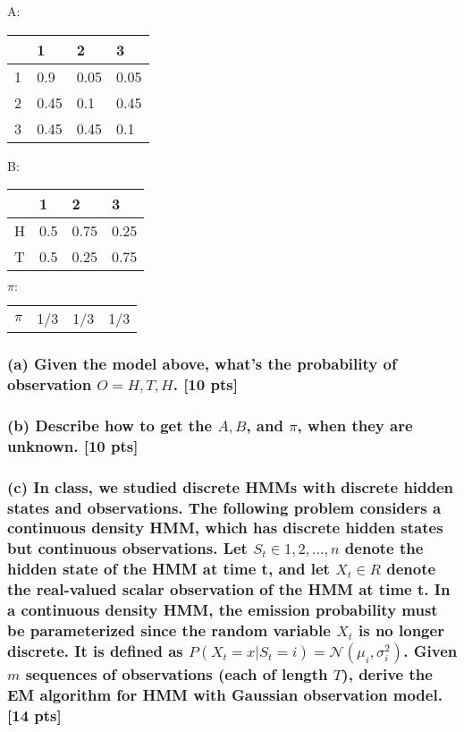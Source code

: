 \documentclass[twoside,11pt]{article}\usepackage{amsmath,amsfonts,amsthm,fullpage}
\begin{document}
\begin{table}[!htb]
    \begin{minipage}{.5\linewidth}
      \centering
A:
    \begin{tabular}{l|l|l|l}
    ~ & 1    & 2    & 3    \\\hline
    1 & 0.9  & 0.05 & 0.05 \\
    2 & 0.45 & 0.1  & 0.45 \\
    3 & 0.45 & 0.45 & 0.1  \\
    \end{tabular}

    \end{minipage}%
    \begin{minipage}{.5\linewidth}
      \centering

B:
    \begin{tabular}{l|l|l|l}
    ~ & 1   & 2    & 3    \\\hline
    H & 0.5 & 0.75 & 0.25 \\
    T & 0.5 & 0.25 & 0.75 \\
    \end{tabular}

    \end{minipage}

    \begin{minipage}{.5\linewidth}
      \centering
$\pi:$
    \begin{tabular}{llll}
    $\pi$ & 1/3 & 1/3 & 1/3 \\
    \end{tabular}
  \end{minipage}

\end{table}

\subsubsection*{(a) Given the model above, what's the probability of observation $O = {H,T,H}$. [10 pts]}

\subsubsection*{(b) Describe how to get the $A, B$, and $\pi$, when they are unknown. [10 pts]}


\subsubsection*{(c) In class, we studied discrete HMMs with discrete hidden states and
observations. The following problem considers a continuous density
HMM, which has discrete hidden states but continuous observations.
Let $S_t \in {1, 2, ..., n}$ denote the hidden state of the HMM at
time t, and let $X_t \in R$ denote the real-valued scalar
observation of the HMM at time t. In a continuous density HMM, the
emission probability must be parameterized since the random variable
$X_t$ is no longer discrete. It is defined as $P(X_t = x|S_t = i) =
\mathcal{N}(\mu_i,\sigma_i^2)$. Given $m$ sequences of observations
(each of length $T$), derive the EM algorithm for HMM with Gaussian
observation model. [14 pts]}
\end{document}
